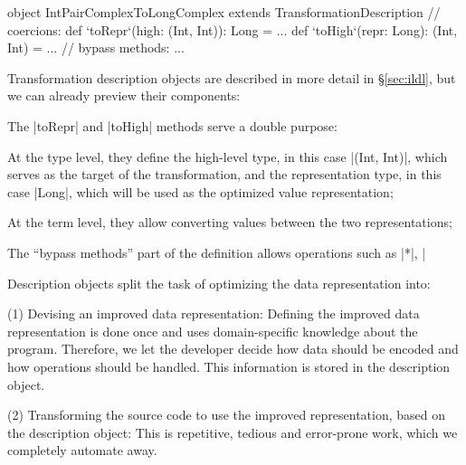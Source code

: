 \begin{lstlisting-nobreak}
object IntPairComplexToLongComplex
          extends TransformationDescription {
  // coercions:
  def `toRepr`(high: (Int, Int)): Long = ...
  def `toHigh`(repr: Long): (Int, Int) = ...
  // bypass methods:
  ...
}
\end{lstlisting-nobreak}

\noindent
Transformation description objects are described in more detail in \S\ref{sec:ildl}, but we can already preview their components:

\vspace{0.35em}
\begin{compactitem}
  \item The |toRepr| and |toHigh| methods serve a double purpose:
  \begin{compactitem}
    \item At the type level, they define the high-level type, in this case |(Int, Int)|, which serves as the target of the transformation, and the representation type, in this case |Long|, which will be used as the optimized value representation;
    \item At the term level, they allow converting values between the two representations;
  \end{compactitem}
  \item The ``bypass methods'' part of the definition allows operations such as |*|, |%
\end{compactitem}
\vspace{0.35em}

Description objects split the task of optimizing the data representation into:

\vspace{0.35em}
\begin{compactitem}
\item[(1)] Devising an improved data representation: Defining the improved data representation is done once and uses domain-specific knowledge about the program. Therefore, we let the developer decide how data should be encoded and how operations should be handled. This information is stored in the description object.
\item[(2)] Transforming the source code to use the improved representation, based on the description object: This is repetitive, tedious and error-prone work, which we completely automate away.
\end{compactitem}
\vspace{0.35em}

